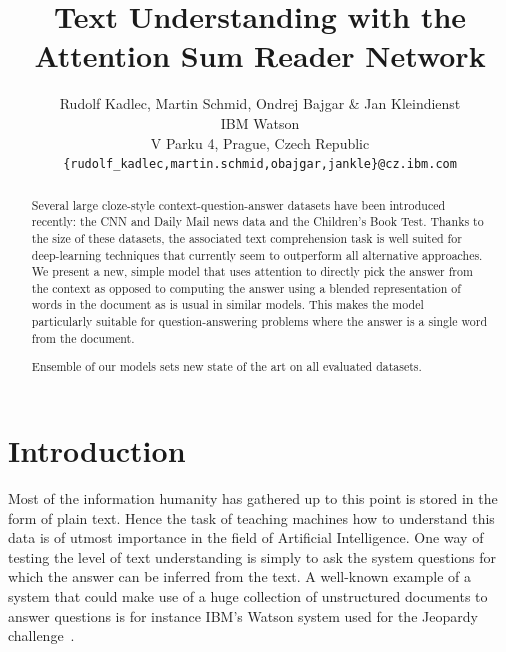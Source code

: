 \documentclass[11pt]{article}
\title{Text Understanding with the Attention Sum Reader Network}
\author{Rudolf Kadlec, Martin Schmid, Ondrej Bajgar \& Jan Kleindienst \\
IBM Watson\\
V Parku 4, Prague, Czech Republic\\
\texttt{\{rudolf\_kadlec,martin.schmid,obajgar,jankle\}@cz.ibm.com} \\ 
}
\newcommand{\MARTIN}[1]{{\color{black}#1}}
\newcommand{\RUDAA}[1]{{\color{black}#1}}
\begin{document}
\maketitle

\begin{abstract}
\MARTIN
{

Several large cloze-style context-question-answer datasets have been introduced recently: the CNN and Daily Mail news data and the Children's Book Test.
Thanks to the size of these datasets, the associated text comprehension task is well suited for deep-learning techniques that currently seem to outperform all alternative approaches.
We present a new, simple model that uses attention to directly pick the answer from the context as opposed to computing the answer using a blended representation of words in the document as is usual in similar models.
This makes the model particularly suitable for question-answering problems where the answer is a single word from the document.}
\RUDAA{Ensemble of our models sets new state of the art on all evaluated datasets.}





\end{abstract}

\section{Introduction}

Most of the information humanity has gathered up to this point is stored in the form of plain text. 
Hence the task of teaching machines how to understand this data is of utmost importance in the field of Artificial Intelligence.
One way of testing the level of text understanding is simply to ask the system questions for which the answer can be inferred from the text.
A well-known example of a system that could make use of a huge collection of unstructured documents to answer questions is for instance 
IBM's Watson system used for the Jeopardy challenge~\cite{Ferrucci2010}.
\end{document}
